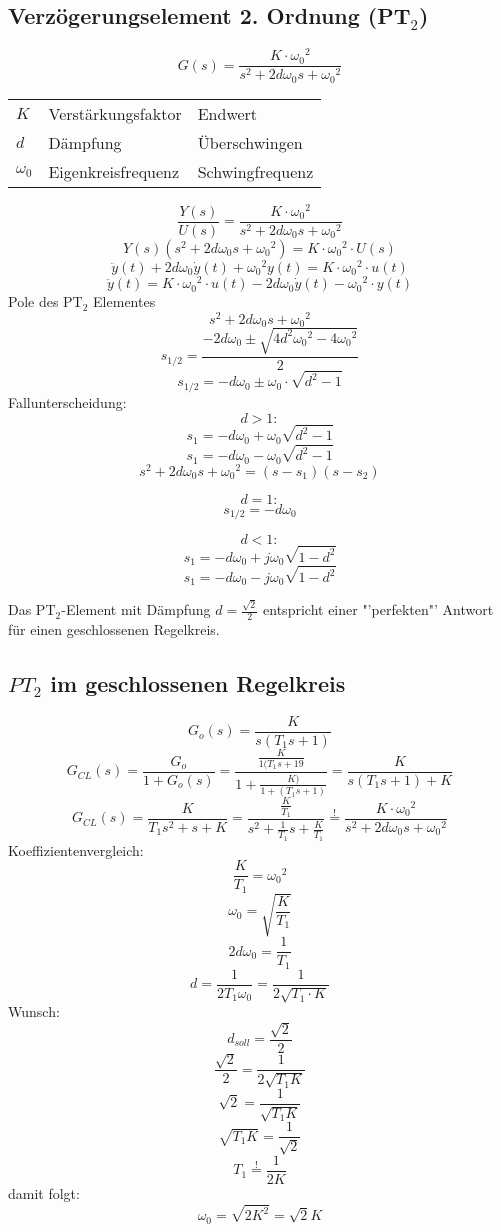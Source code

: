 \subsection{Verzögerungselement 2. Ordnung (PT$_2$)}
\[ G(s) = \frac{K \cdot {\omega_0}^2}{s^2 + 2 d \omega_0 s + {\omega_0}^2} \]
\begin{tabular}{ll@{$ ~ \rightarrow ~ $}l}
$K$ & Verstärkungsfaktor & Endwert \\
$d$ & Dämpfung & Überschwingen \\
$\omega_0$ & Eigenkreisfrequenz & Schwingfrequenz \\
\end{tabular}
\[ \frac{Y(s)}{U(s)} = \frac{K \cdot {\omega_0}^2}{s^2 + 2 d \omega_0 s + {\omega_0}^2} \]
\[ Y(s) (s^2 + 2 d \omega_0 s + {\omega_0}^2) = K \cdot {\omega_0}^2 \cdot U(s) \]
\[ \ddot{y}(t) + 2 d \omega_0 \dot{y}(t) + {\omega_0}^2 y(t) = K \cdot {\omega_0}^2 \cdot u(t) \]
\[ \ddot{y}(t) = K \cdot {\omega_0}^2 \cdot u(t) - 2 d \omega_0 \dot{y}(t) - {\omega_0}^2 \cdot y(t) \]
Pole des PT$_2$ Elementes
\[ s^2 + 2 d \omega_0 s + {\omega_0}^2 \]
\[ s_{1/2} = \frac{-2 d \omega_0 \pm \sqrt{4 d^2 {\omega_0}^2 - 4 {\omega_0}^2}}{2} \]
\[ s_{1/2} = -d \omega_0 \pm \omega_0 \cdot \sqrt{d^2 - 1} \]
Fallunterscheidung: 
\[ d > 1: \]
\[ s_1 = -d \omega_0 + \omega_0 \sqrt{d^2 - 1} \]
\[ s_1 = -d \omega_0 - \omega_0 \sqrt{d^2 - 1} \]
\[ s^2 + 2 d \omega_0 s + {\omega_0}^2 = (s - s_1) (s - s_2) \]

\[ d = 1: \]
\[ s_{1/2} = -d\omega_0 \]

\[ d < 1: \]
\[ s_1 = -d\omega_0 + j \omega_0 \sqrt{1 - d^2} \]
\[ s_1 = -d\omega_0 - j \omega_0 \sqrt{1 - d^2} \]

Das PT$_2$-Element mit Dämpfung $d = \frac{\sqrt{2}}{2}$ entspricht einer 
"'perfekten"' Antwort für einen geschlossenen Regelkreis. 

\subsection{$PT_2$ im geschlossenen Regelkreis}
\[ G_o(s) = \frac{K}{s (T_1 s + 1)} \]
\[ G_{CL}(s) = \frac{G_o}{1 + G_o(s)} = \frac{\frac{K}{1 (T_1 s + 19}}{1 + \frac{K)}{1 + (T_1 s + 1)}} = \frac{K}{s (T_1 s + 1) + K} \]
\[ G_{CL}(s) = \frac{K}{T_1 s^2 + s + K} = \frac{\frac{K}{T_1}}{s^2 + \frac{1}{T_1} s + \frac{K}{T_1}} \stackrel{!}{=} \frac{K \cdot {\omega_0}^2}{s^2 + 2 d \omega_0 s + {\omega_0}^2} \]
Koeffizientenvergleich:
\[ \frac{K}{T_1} = {\omega_0}^2 \]
\[ \omega_0 = \sqrt{\frac{K}{T_1}} \]
\[ 2 d \omega_0 = \frac{1}{T_1} \]
\[ d = \frac{1}{2 T_1 \omega_0} = \frac{1}{2 \sqrt{T_1 \cdot K}} \]
Wunsch: 
\[ d_{soll} = \frac{\sqrt{2}}{2} \]
\[ \frac{\sqrt{2}}{2} = \frac{1}{2 \sqrt{T_1 K}} \]
\[ \sqrt{2} = \frac{1}{\sqrt{T_1 K}} \]
\[ \sqrt{T_1 K} = \frac{1}{\sqrt{2}} \]
\[ T_1 \stackrel{!}{=} \frac{1}{2 K} \]
damit folgt:
\[ \omega_0 = \sqrt{2 K^2} = \sqrt{2} K \]

